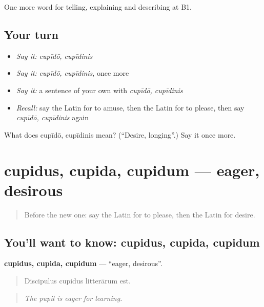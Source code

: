 \begin{grammarlens}[title={What you've built}]
One more word for telling, explaining and describing at B1.
\end{grammarlens}

\subsection*{Your turn}
\begin{itemize}
\raggedright
  \item \emph{Say it:} \emph{cupīdō, cupīdinis}
  \item \emph{Say it:} \emph{cupīdō, cupīdinis}, once more
  \item \emph{Say it:} a sentence of your own with \emph{cupīdō, cupīdinis}
  \item \emph{Recall:} say the Latin for to amuse, then the Latin for to please, then say \emph{cupīdō, cupīdinis} again
\end{itemize}

\begin{tcolorbox}[breakable,colback=teal!4,colframe=teal!35!black,title={Before you move on}]
What does cupīdō, cupīdinis mean? (\textquotedblleft{}Desire, longing\textquotedblright{}.) Say it once more.
\end{tcolorbox}
\section[cupidus, cupida, cupidum]{cupidus, cupida, cupidum — eager, desirous}

\label{lesson:LA-C500-cupidus}



\begin{quote}
Before the new one: say the Latin for to please, then the Latin for desire.
\end{quote}

\subsection*{You'll want to know: cupidus, cupida, cupidum}
\textbf{cupidus, cupida, cupidum} — \textquotedblleft{}eager, desirous\textquotedblright{}.

\begin{quote}
Discipulus cupidus litterārum est.
\end{quote}

\begin{quote}
\emph{The pupil is eager for learning.}
\end{quote}

